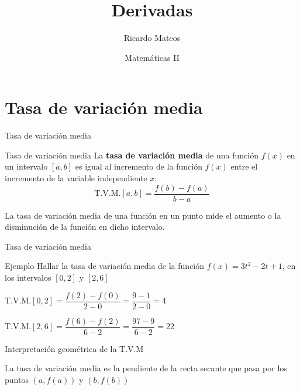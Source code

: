 \documentclass[8pt]{beamer}
\title{Derivadas}
\author{Ricardo Mateos}
\institute[UHEI-IVED]{Departamento de Matemáticas \\ UHEI - IVED}
\date{Matemáticas II}
\begin{document}
\begin{frame}
\maketitle
\end{frame}

\begin{frame}
\tableofcontents
\end{frame}
\section{Tasa de variación media}

\begin{frame}{Tasa de variación media}

\begin{alertblock}{Tasa de variación media}
La \textbf{tasa de variación media} de una función $f(x)$ en un intervalo $[a,b]$ es igual al incremento de la función $f(x)$ entre el incremento de la variable independiente $x$:
\[ \text{T.V.M.}[a,b] = \dfrac{f(b)-f(a)}{b-a} \]
\end{alertblock}

\pause
La tasa de variación media de una función en un punto mide el aumento o la disminución de la función en dicho intervalo.
\end{frame}

\begin{frame}{Tasa de variación media}
\begin{exampleblock}{Ejemplo}
Hallar la tasa de variación media de la función $f(x)=3t^2-2t+1$, en los intervalos $[0,2]$ y $[2,6]$	
\end{exampleblock}
\pause

$\text{T.V.M.}[0,2] = \dfrac{f(2)-f(0)}{2-0}= \dfrac{9-1}{2-0}=4$

\pause

$\text{T.V.M.}[2,6] = \dfrac{f(6)-f(2)}{6-2}= \dfrac{97-9}{6-2}=22$


\end{frame}
\begin{frame}{Interpretación geométrica de la T.V.M}

La tasa de variación media es la pendiente de la recta secante que pasa por los puntos $(a,f(a))$ y $(b,f(b))$
\end{frame}
\end{document}
